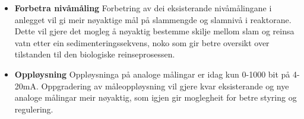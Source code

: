\begin{itemize}
    \item \textbf{Forbetra nivåmåling} \newline
        Forbetring av dei eksisterande nivåmålingane i anlegget vil gi meir nøyaktige mål på slammengde og slamnivå i reaktorane.
        Dette vil gjere det mogleg å nøyaktig bestemme skilje mellom slam og reinsa vatn etter ein sedimenteringssekvens,
        noko som gir betre oversikt over tilstanden til den biologiske reinseprosessen.
    \item \textbf{Oppløysning} \newline
        Oppløysninga på analoge målingar er idag kun 0-1000 bit på 4-20mA. \newline
        Oppgradering av måleoppløysning vil gjere kvar eksisterande og nye analoge målingar
        meir nøyaktig, som igjen gir moglegheit for betre styring og regulering.
\end{itemize}
\newpage


